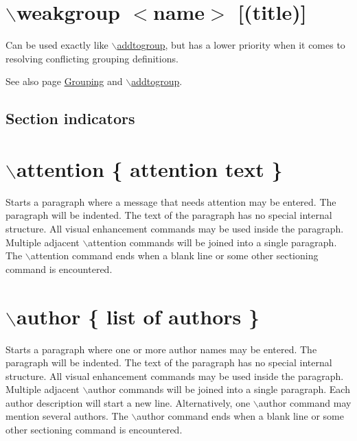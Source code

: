  \hypertarget{commands_cmdweakgroup}{}\section{$\backslash$weakgroup $<$name$>$ \mbox{[}(title)\mbox{]}}\label{commands_cmdweakgroup}
 Can be used exactly like \hyperlink{commands_cmdaddtogroup}{$\backslash$addtogroup}, but has a lower priority when it comes to resolving conflicting grouping definitions.

\begin{DoxySeeAlso}{See also}
page \hyperlink{grouping}{Grouping} and \hyperlink{commands_cmdaddtogroup}{$\backslash$addtogroup}.
\end{DoxySeeAlso}




 \subsection*{ Section indicators  }





 \hypertarget{commands_cmdattention}{}\section{$\backslash$attention \{ attention text \}}\label{commands_cmdattention}
 Starts a paragraph where a message that needs attention may be entered. The paragraph will be indented. The text of the paragraph has no special internal structure. All visual enhancement commands may be used inside the paragraph. Multiple adjacent $\backslash$attention commands will be joined into a single paragraph. The $\backslash$attention command ends when a blank line or some other sectioning command is encountered.\hypertarget{commands_cmdauthor}{}\section{$\backslash$author \{ list of authors \}}\label{commands_cmdauthor}
 Starts a paragraph where one or more author names may be entered. The paragraph will be indented. The text of the paragraph has no special internal structure. All visual enhancement commands may be used inside the paragraph. Multiple adjacent $\backslash$author commands will be joined into a single paragraph. Each author description will start a new line. Alternatively, one $\backslash$author command may mention several authors. The $\backslash$author command ends when a blank line or some other sectioning command is encountered.

